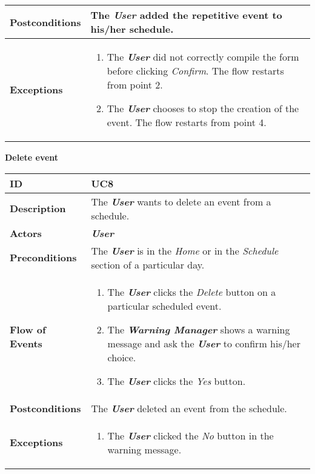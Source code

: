 \begin{tabularx}{\linewidth}{| l | X|}
	\hline
	
	\textbf{Postconditions} & The \textbf{\textit{User}} added the repetitive event to his/her schedule. \\
	
	\hline
	\textbf{Exceptions} & \parbox{0.68\textwidth}{ \begin{enumerate}
			\item The \textbf{\textit{User}} did not correctly compile the form before clicking \textit{Confirm}. The flow restarts from point 2.
			\item The \textbf{\textit{User}} chooses to stop the creation of the event. The flow restarts from point 4.
	\end{enumerate}}\\
	
	\hline
	
\end{tabularx}

\begin{center}
	\textbf{Delete event}
\end{center}

\begin{tabularx}{\linewidth}{| l | X |}
	\hline
	\textbf{ID} & UC8\\
	
	\hline
	\textbf{Description} & The \textbf{\textit{User}} wants to delete an event from a schedule.\\
	
	\hline
	\textbf{Actors} & \textbf{\textit{User}}\\
	
	\hline
	\textbf{Preconditions} & The \textbf{\textit{User}} is in the \textit{Home} or in the \textit{Schedule} section of a particular day.\\
	
	\hline
	\textbf{Flow of Events} & \parbox{0.7\textwidth}{\begin{enumerate}
			\item The \textbf{\textit{User}} clicks the \textit{Delete} button on a particular scheduled event.
			\item The \textbf{\textit{Warning Manager}} shows a warning message and ask the \textbf{\textit{User}} to confirm his/her choice.
			\item The \textbf{\textit{User}} clicks the \textit{Yes} button.
	\end{enumerate}}\\
	
	\hline
	\textbf{Postconditions} & The \textbf{\textit{User}} deleted an event from the schedule. \\
	
	\hline
	\textbf{Exceptions} & \parbox{0.7\textwidth}{ \begin{enumerate}
			\item The \textbf{\textit{User}} clicked the \textit{No} button in the warning message.
	\end{enumerate}}\\
	
	\hline
	
\end{tabularx}


